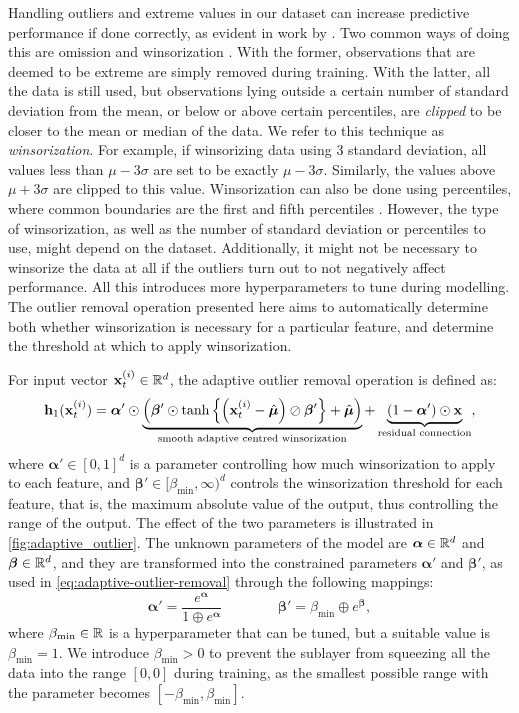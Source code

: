 \documentclass{statsmsc}
\begin{document}
{Handling outliers and extreme values in our dataset can increase predictive performance if done
correctly, as evident in work by \cite{outlier_wind}.
Two common ways of doing this are omission and winsorization
\citep{winsorization}. With the former, observations that are deemed to be extreme are simply
removed during training. With the latter, all the data is still used, but observations lying
outside a certain number of standard deviation from the mean, or below or above certain
percentiles, are \textit{clipped} to be closer to the mean or median of the data. We refer to this
technique as \textit{winsorization}.
For example, if winsorizing data using 3 standard deviation, all values less than
$\mu-3\sigma$ are set to be exactly $\mu-3\sigma$. Similarly, the values above
$\mu+3\sigma$ are clipped to this value. Winsorization can also be done using percentiles,
where common boundaries are the first and fifth percentiles \citep{winsorization}.
However, the type of winsorization, as well as the number of standard deviation
or percentiles to use, might depend on the dataset. Additionally, it might not
be necessary to winsorize the data at all if the outliers turn out to not
negatively affect performance. All this introduces more hyperparameters to tune
during modelling. The outlier removal operation presented here aims to automatically  determine both
whether winsorization is necessary for a particular feature, and determine the threshold at
which to apply winsorization.

For input vector $\mathbf{x}_t^{(i)} \in \mathbb{R}^d$, the adaptive outlier removal operation is defined as:
\begin{equation}\label{eq:adaptive-outlier-removal}
    \mathbf{h}_1(\mathbf{x}_t^{(i)})=\bm\alpha' \odot \underbrace{\left(\bm\beta' \odot
        \tanh\left\{\left(\mathbf{x}_t^{(i)}-\hat{\bm\mu}\right) \oslash \bm\beta'  \right\}+\hat{\bm\mu}
\right)}_{\text{smooth adaptive centred winsorization}}
    +\underbrace{\left(1-\bm\alpha' \right) \odot \mathbf{x}}_{\text{residual connection}},
\end{equation}
where
$\bm\alpha' \in [0,1]^d$ is a parameter controlling how much winsorization to apply to each feature,
and $\bm\beta' \in [\beta_{\text{min}},\infty)^d$ controls the winsorization threshold for
each feature, that is, the maximum absolute value of the output, thus controlling the range of the
output. The effect of the two parameters is illustrated in \cref{fig:adaptive_outlier}.
The unknown parameters of the model are $\bm\alpha \in \mathbb{R}^d$ and $\bm\beta \in \mathbb{R}^d$, and they
are transformed into the constrained parameters $\bm\alpha'$ and $\bm\beta'$, as used in
\cref{eq:adaptive-outlier-removal} through the following  mappings:
\begin{equation}
    \bm\alpha'=\frac{e^{\bm\alpha}}{1\oplus e^{\bm\alpha}} \qquad\qquad
    \bm\beta'=\beta_{\text{min}}\oplus e^{\bm\beta},
\end{equation}
where $\beta_{\textrm{min}} \in \mathbb{R}$ is a hyperparameter that can be tuned, but a suitable value is $\beta_{\textrm{min}}=1$. We introduce $\beta_{\textrm{min}}>0$ to prevent the sublayer from
squeezing all the data into the range $[0,0]$ during training, as the smallest possible range
with the parameter becomes $[-\beta_{\textrm{min}}, \beta_{\textrm{min}}]$.


}
\end{document}
